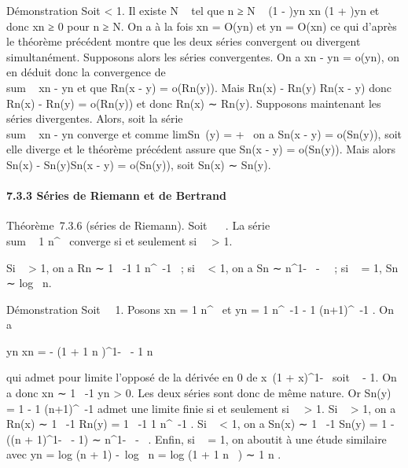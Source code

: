 Démonstration Soit \epsilon \textless{} 1. Il existe N \in {}~ tel que n ≥ N \rigtharrow~ (1 -
\epsilon)yn \leq xn \leq (1 + \epsilon)yn et donc xn
≥ 0 pour n ≥ N. On a à la fois xn = O(yn) et
yn = O(xn) ce qui d'après le théorème précédent
montre que les deux séries convergent ou divergent simultanément.
Supposons alors les séries convergentes. On a \textbar{}xn -
yn\textbar{} = o(yn), on en déduit donc la
convergence de \\sum ~
\textbar{}xn - yn\textbar{} et que
Rn(\textbar{}x - y\textbar{}) = o(Rn(y)). Mais
\textbar{}Rn(x) - Rn(y)\textbar{}\leq
Rn(\textbar{}x - y\textbar{}) donc \textbar{}Rn(x) -
Rn(y)\textbar{} = o(Rn(y)) et donc Rn(x) ∼
Rn(y). Supposons maintenant les séries divergentes. Alors,
soit la série \\sum ~
\textbar{}xn - yn\textbar{} converge et comme
limSn~(y) = +\infty~ on a
Sn(\textbar{}x - y\textbar{}) = o(Sn(y)), soit elle
diverge et le théorème précédent assure que Sn(\textbar{}x -
y\textbar{}) = o(Sn(y)). Mais alors \textbar{}Sn(x)
- Sn(y)\textbar{}\leq Sn(\textbar{}x - y\textbar{}) =
o(Sn(y)), soit Sn(x) ∼ Sn(y).

\paragraph{7.3.3 Séries de Riemann et de Bertrand}

Théorème~7.3.6 (séries de Riemann). Soit \alpha~ \in {}~. La série
\\sum ~  1
\over n^\alpha~ converge si et seulement si~\alpha~
\textgreater{} 1.

Si \alpha~ \textgreater{} 1, on a Rn ∼ 1 \over
\alpha~-1  1 \over n^\alpha~-1 ~; si \alpha~ \textless{}
1, on a Sn ∼ n^1-\alpha~ -\alpha~ ~;
si \alpha~ = 1, Sn ∼ log~ n.

Démonstration Soit \alpha~\neq~1. Posons xn
= 1 \over n^\alpha~ et yn = 1
\over n^\alpha~-1 - 1 \over
(n+1)^\alpha~-1 . On a

 yn \over xn = - (1 + 1
\over n )^1-\alpha~ - 1 
\over n 

qui admet pour limite l'opposé de la dérivée en 0 de
x\mapsto~(1 + x)^1-\alpha~ soit \alpha~ - 1. On a
donc xn ∼ 1 \over \alpha~-1 yn
\textgreater{} 0. Les deux séries sont donc de même nature. Or
Sn(y) = 1 - 1 \over (n+1)^\alpha~-1
admet une limite finie si et seulement si~\alpha~ \textgreater{} 1. Si \alpha~
\textgreater{} 1, on a Rn(x) ∼ 1 \over \alpha~-1
Rn(y) = 1 \over \alpha~-1  1
\over n^\alpha~-1 . Si \alpha~ \textless{} 1, on a
Sn(x) ∼ 1 \over \alpha~-1 Sn(y) = 1
-\alpha~ ((n + 1)^1-\alpha~ - 1) ∼
n^1-\alpha~ -\alpha~ . Enfin, si \alpha~ = 1, on
aboutit à une étude similaire avec yn
= log (n + 1) -\ log~
n = log (1 + 1 \over n~ )
∼ 1 \over n .

